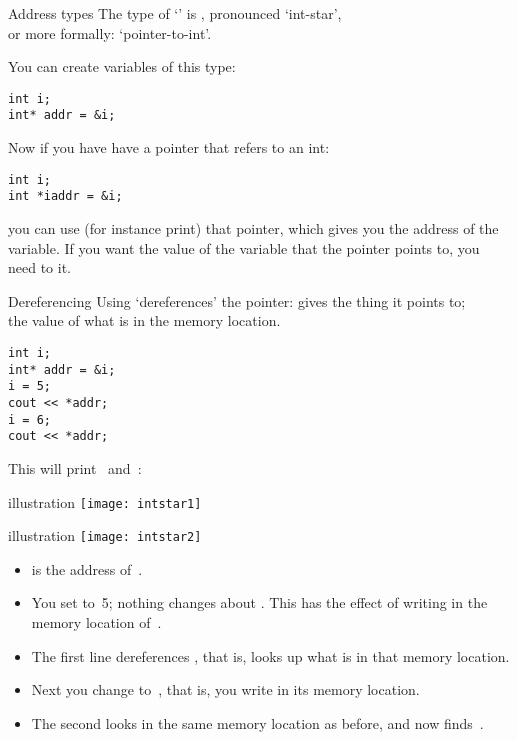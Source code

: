 \begin{block}{Address types}
  \label{sl:intstar}
  The type of `' is , pronounced `int-star',\\
  or more
  formally: `pointer-to-int'.

  You can create variables of this type:
\begin{verbatim}
int i;
int* addr = &i;
\end{verbatim}
\end{block}

Now if you have have a pointer that refers to an int:
\begin{verbatim}
int i;
int *iaddr = &i;
\end{verbatim}
you can use (for instance print) that pointer, which gives you the
address of the variable. If you want the value of the variable that
the pointer points to, you need to  it.

\begin{block}{Dereferencing}
  \label{sl:starderef}
    Using  `dereferences' the pointer: gives the thing it
    points to;\\
    the value of what
    is in the memory location.

\begin{verbatim}
int i;
int* addr = &i;
i = 5;
cout << *addr;
i = 6;
cout << *addr;
\end{verbatim}
This will print~ and~:
\end{block}

\begin{block}{illustration}
  \label{sl:copy-pic}
  \texttt{[image: intstar1]}
\end{block}

\begin{block}{illustration}
  \label{sl:deref-pic}
  \texttt{[image: intstar2]}
\end{block}

\begin{itemize}
\item {} is the address of~.
\item You set  to~5; nothing changes about . This has the
  effect of writing  in the memory location of~.
\item The first  line dereferences , that is, looks up
  what is in that memory location.
\item Next you change  to~, that is, you write  in its
  memory location.
\item The second  looks in the same memory location as before,
  and now finds~.
\end{itemize}


